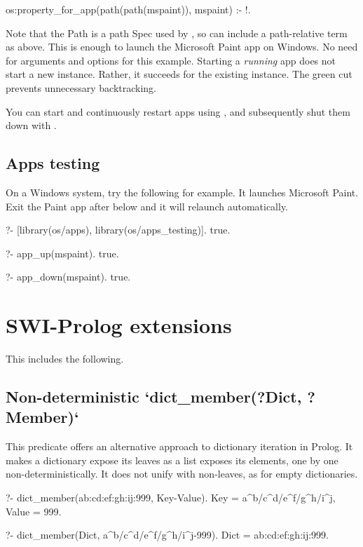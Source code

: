 \begin{code}
os:property_for_app(path(path(mspaint)), mspaint) :- !.
\end{code}

Note that the Path is a path Spec used by , so can include a
path-relative term as above. This is enough to launch the Microsoft Paint app on
Windows. No need for arguments and options for this example. Starting a \textit{running}
app does not start a new instance. Rather, it succeeds for the existing
instance. The green cut prevents unnecessary backtracking.

You can start and continuously restart apps using , and subsequently
shut them down with .

\subsection{Apps testing}

On a Windows system, try the following for example. It launches Microsoft Paint.
Exit the Paint app after  below and it will relaunch automatically.

\begin{code}
?- [library(os/apps), library(os/apps_testing)].
true.

?- app_up(mspaint).
true.

?- app_down(mspaint).
true.
\end{code}

\section{SWI-Prolog extensions}

This includes the following.

\subsection{Non-deterministic `dict_member(?Dict, ?Member)`}

This predicate offers an alternative approach to dictionary iteration in
Prolog. It makes a dictionary expose its leaves as a list exposes its
elements, one by one non-deterministically. It does not unify with
non-leaves, as for empty dictionaries.

\begin{code}
?- dict_member(a{b:c{d:e{f:g{h:i{j:999}}}}}, Key-Value).
Key = a^b/c^d/e^f/g^h/i^j,
Value = 999.

?- dict_member(Dict, a^b/c^d/e^f/g^h/i^j-999).
Dict = a{b:c{d:e{f:g{h:i{j:999}}}}}.
\end{code}

